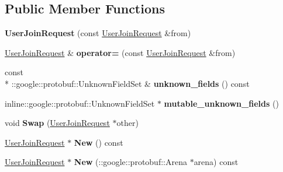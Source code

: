 \subsection*{Public Member Functions}
\begin{DoxyCompactItemize}
\item 
\hypertarget{classSimpleChat_1_1UserJoinRequest_a5c314549198119d803ebcae6f918e0df}{{\bfseries User\-Join\-Request} (const \hyperlink{classSimpleChat_1_1UserJoinRequest}{User\-Join\-Request} \&from)}\label{classSimpleChat_1_1UserJoinRequest_a5c314549198119d803ebcae6f918e0df}

\item 
\hypertarget{classSimpleChat_1_1UserJoinRequest_a94e16681aba97f45338f5273ef4844e1}{\hyperlink{classSimpleChat_1_1UserJoinRequest}{User\-Join\-Request} \& {\bfseries operator=} (const \hyperlink{classSimpleChat_1_1UserJoinRequest}{User\-Join\-Request} \&from)}\label{classSimpleChat_1_1UserJoinRequest_a94e16681aba97f45338f5273ef4844e1}

\item 
\hypertarget{classSimpleChat_1_1UserJoinRequest_a90b9270f5623668f8d121a5614f771d6}{const \\*
\-::google\-::protobuf\-::\-Unknown\-Field\-Set \& {\bfseries unknown\-\_\-fields} () const }\label{classSimpleChat_1_1UserJoinRequest_a90b9270f5623668f8d121a5614f771d6}

\item 
\hypertarget{classSimpleChat_1_1UserJoinRequest_a57ca214eb06071e26fef7d1bbb4b883d}{inline\-::google\-::protobuf\-::\-Unknown\-Field\-Set $\ast$ {\bfseries mutable\-\_\-unknown\-\_\-fields} ()}\label{classSimpleChat_1_1UserJoinRequest_a57ca214eb06071e26fef7d1bbb4b883d}

\item 
\hypertarget{classSimpleChat_1_1UserJoinRequest_a427d21d6091c09e761ebbba4a0d80393}{void {\bfseries Swap} (\hyperlink{classSimpleChat_1_1UserJoinRequest}{User\-Join\-Request} $\ast$other)}\label{classSimpleChat_1_1UserJoinRequest_a427d21d6091c09e761ebbba4a0d80393}

\item 
\hypertarget{classSimpleChat_1_1UserJoinRequest_a0150a989e981f3fd7251433b40864a51}{\hyperlink{classSimpleChat_1_1UserJoinRequest}{User\-Join\-Request} $\ast$ {\bfseries New} () const }\label{classSimpleChat_1_1UserJoinRequest_a0150a989e981f3fd7251433b40864a51}

\item 
\hypertarget{classSimpleChat_1_1UserJoinRequest_abd14064bf5bfe987d71cb7ed385eed16}{\hyperlink{classSimpleChat_1_1UserJoinRequest}{User\-Join\-Request} $\ast$ {\bfseries New} (\-::google\-::protobuf\-::\-Arena $\ast$arena) const }\label{classSimpleChat_1_1UserJoinRequest_abd14064bf5bfe987d71cb7ed385eed16}


\end{DoxyCompactItemize}
